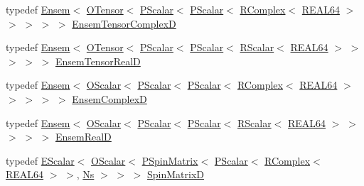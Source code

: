 \begin{DoxyCompactItemize}
\item 
typedef \mbox{\hyperlink{classENSEM_1_1Ensem}{Ensem}}$<$ \mbox{\hyperlink{classENSEM_1_1OTensor}{O\+Tensor}}$<$ \mbox{\hyperlink{classENSEM_1_1PScalar}{P\+Scalar}}$<$ \mbox{\hyperlink{classENSEM_1_1PScalar}{P\+Scalar}}$<$ \mbox{\hyperlink{classENSEM_1_1RComplex}{R\+Complex}}$<$ \mbox{\hyperlink{namespaceENSEM_a85b215b9f1f43715aebee01718e25082}{R\+E\+A\+L64}} $>$ $>$ $>$ $>$ $>$ \mbox{\hyperlink{group__defs_ga15d48d3a11743bbf79e7b90cf889f3f0}{Ensem\+Tensor\+ComplexD}}
\item 
typedef \mbox{\hyperlink{classENSEM_1_1Ensem}{Ensem}}$<$ \mbox{\hyperlink{classENSEM_1_1OTensor}{O\+Tensor}}$<$ \mbox{\hyperlink{classENSEM_1_1PScalar}{P\+Scalar}}$<$ \mbox{\hyperlink{classENSEM_1_1PScalar}{P\+Scalar}}$<$ \mbox{\hyperlink{classENSEM_1_1RScalar}{R\+Scalar}}$<$ \mbox{\hyperlink{namespaceENSEM_a85b215b9f1f43715aebee01718e25082}{R\+E\+A\+L64}} $>$ $>$ $>$ $>$ $>$ \mbox{\hyperlink{group__defs_gaa7c1a5f20d03b806876d3ab2576ec104}{Ensem\+Tensor\+RealD}}
\item 
typedef \mbox{\hyperlink{classENSEM_1_1Ensem}{Ensem}}$<$ \mbox{\hyperlink{classENSEM_1_1OScalar}{O\+Scalar}}$<$ \mbox{\hyperlink{classENSEM_1_1PScalar}{P\+Scalar}}$<$ \mbox{\hyperlink{classENSEM_1_1PScalar}{P\+Scalar}}$<$ \mbox{\hyperlink{classENSEM_1_1RComplex}{R\+Complex}}$<$ \mbox{\hyperlink{namespaceENSEM_a85b215b9f1f43715aebee01718e25082}{R\+E\+A\+L64}} $>$ $>$ $>$ $>$ $>$ \mbox{\hyperlink{group__defs_gaa1c62d46cc410553bbcb87757e212505}{Ensem\+ComplexD}}
\item 
typedef \mbox{\hyperlink{classENSEM_1_1Ensem}{Ensem}}$<$ \mbox{\hyperlink{classENSEM_1_1OScalar}{O\+Scalar}}$<$ \mbox{\hyperlink{classENSEM_1_1PScalar}{P\+Scalar}}$<$ \mbox{\hyperlink{classENSEM_1_1PScalar}{P\+Scalar}}$<$ \mbox{\hyperlink{classENSEM_1_1RScalar}{R\+Scalar}}$<$ \mbox{\hyperlink{namespaceENSEM_a85b215b9f1f43715aebee01718e25082}{R\+E\+A\+L64}} $>$ $>$ $>$ $>$ $>$ \mbox{\hyperlink{group__defs_gaabc6e707d8e7066c144fa8f9fa002f2e}{Ensem\+RealD}}
\item 
typedef \mbox{\hyperlink{classENSEM_1_1EScalar}{E\+Scalar}}$<$ \mbox{\hyperlink{classENSEM_1_1OScalar}{O\+Scalar}}$<$ \mbox{\hyperlink{classENSEM_1_1PSpinMatrix}{P\+Spin\+Matrix}}$<$ \mbox{\hyperlink{classENSEM_1_1PScalar}{P\+Scalar}}$<$ \mbox{\hyperlink{classENSEM_1_1RComplex}{R\+Complex}}$<$ \mbox{\hyperlink{namespaceENSEM_a85b215b9f1f43715aebee01718e25082}{R\+E\+A\+L64}} $>$ $>$, \mbox{\hyperlink{namespaceENSEM_a6f05e048f9b2eb1a19131074f8abc25f}{Ns}} $>$ $>$ $>$ \mbox{\hyperlink{group__defs_ga9a03c1e03f1df3df33fe8cf7f4a8786f}{Spin\+MatrixD}}

\end{DoxyCompactItemize}
